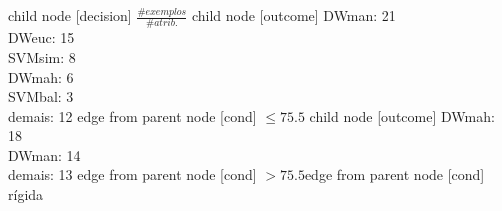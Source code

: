 child {node [decision] {$\frac{\#exemplos}{\#atrib.}$}
child {node [outcome] {
DWman: 21\\
DWeuc: 15\\
SVMsim: 8\\
DWmah: 6\\
SVMbal: 3\\
demais: 12} edge from parent node [cond] {$\leq75.5$}}
child {node [outcome] {
DWmah: 18\\
DWman: 14\\
demais: 13} edge from parent node [cond] {$>75.5$}}edge from parent node [cond] {rígida}}
